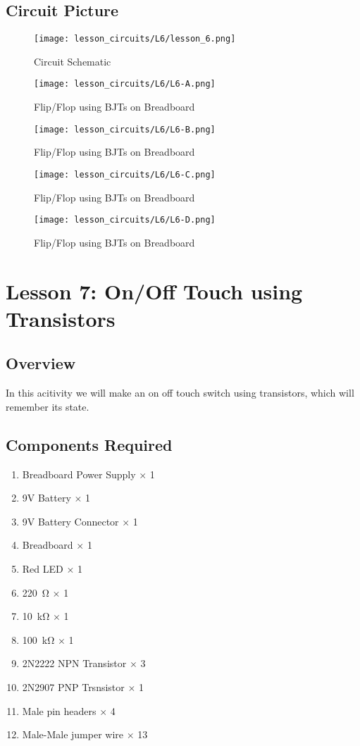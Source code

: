 \subsection{Circuit Picture}
\begin{figure}[htp]
    \centering
    \texttt{[image: lesson\_circuits/L6/lesson\_6.png]}
    \caption{Circuit Schematic}
    \label{fig:ff_bjt_sch}
\end{figure}
\begin{figure}[htp]
    \centering
    \texttt{[image: lesson\_circuits/L6/L6-A.png]}
    \caption{Flip/Flop using BJTs on Breadboard}
    \label{fig:ff_obb1}
\end{figure}
\begin{figure}[htp]
    \centering
    \texttt{[image: lesson\_circuits/L6/L6-B.png]}
    \caption{Flip/Flop using BJTs on Breadboard}
    \label{fig:ff_obb2}
\end{figure}
\begin{figure}[htp]
    \centering
    \texttt{[image: lesson\_circuits/L6/L6-C.png]}
    \caption{Flip/Flop using BJTs on Breadboard}
    \label{fig:ff_obb3}
\end{figure}
\begin{figure}[htp]
    \centering
    \texttt{[image: lesson\_circuits/L6/L6-D.png]}
    \caption{Flip/Flop using BJTs on Breadboard}
    \label{fig:ff_obb4}
\end{figure}


\section{Lesson 7: On/Off Touch using Transistors}
\subsection{Overview}
In this acitivity we will make an on off touch switch using transistors, which will remember its state.
\subsection{Components Required}
\begin{enumerate}
    \item Breadboard Power Supply $\times$ 1
    \item 9V Battery $\times$ 1
    \item 9V Battery Connector $\times$ 1
    \item Breadboard $\times$ 1
    \item Red LED $\times$ 1
    \item \SI{220}{\ohm} $\times$ 1
    \item \SI{10}{\kilo\ohm} $\times$ 1
    \item \SI{100}{\kilo\ohm} $\times$ 1
    \item 2N2222 NPN Transistor $\times$ 3
    \item 2N2907 PNP Trsnsistor $\times$ 1
    \item Male pin headers $\times$ 4
    \item Male-Male jumper wire $\times$ 13
\end{enumerate}
